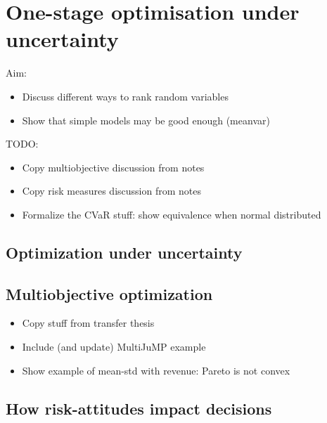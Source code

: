 \documentclass[main.tex]{subfiles}
\begin{document}
\chapter{One-stage optimisation under uncertainty}


Aim:
\begin{itemize}
\item Discuss different ways to rank random variables
\item Show that simple models may be good enough (meanvar)
\end{itemize}

TODO:
\begin{itemize}
\item Copy multiobjective discussion from notes
\item Copy risk measures discussion from notes
\item Formalize the CVaR stuff: show equivalence when normal distributed
\end{itemize}

\section{Optimization under uncertainty}


\section{Multiobjective optimization}
\begin{itemize}
\item Copy stuff from transfer thesis
\item Include (and update) MultiJuMP example
\item Show example of mean-std with revenue: Pareto is not convex
\end{itemize}

\section{How risk-attitudes impact decisions}

\biblio{} %
\end{document}
